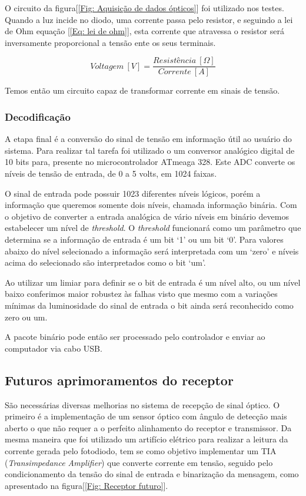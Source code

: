 O circuito da figura[\ref{Fig: Aquisição de dados ópticos}] foi utilizado nos testes. Quando a luz incide no diodo, uma corrente passa pelo resistor, e seguindo a lei de Ohm equação [\ref{Eq: lei de ohm}], esta corrente que atravessa o resistor será inversamente proporcional a tensão ente os seus terminais.

\begin{equation}
Voltagem\:[V] = \frac{Resistência\: [\Omega]}{Corrente\: [A]}
\label{Eq: lei de ohm}
\end{equation}

Temos então um circuito capaz de transformar corrente em sinais de tensão.

\subsubsection{Decodificação}

A etapa final é a conversão do sinal de tensão em informação útil ao usuário do sistema. Para realizar tal tarefa foi utilizado o um conversor analógico digital de 10 bits para, presente no microcontrolador ATmeaga 328. Este ADC converte os níveis de tensão de entrada, de 0 a 5 volts, em 1024 faixas.

O sinal de entrada pode possuir 1023 diferentes níveis lógicos, porém a informação que queremos somente dois níveis, chamada informação binária. 
Com o objetivo de converter a entrada analógica de vário níveis em binário devemos estabelecer um nível de \textit{threshold}. O \textit{threshold} funcionará como um parâmetro que determina se a informação de entrada é um bit \lq 1\rq \: ou um bit \lq 0\rq \:. Para valores abaixo do nível selecionado a informação será interpretada com um \lq zero\rq \: e níveis acima do selecionado são interpretados como o bit \lq um\rq \:.

Ao utilizar um limiar para definir se o bit de entrada é um nível alto, ou um nível baixo conferimos maior robustez às falhas visto que mesmo com a variações mínimas da luminosidade do sinal de entrada o bit ainda será reconhecido como zero ou um.

A pacote binário pode então ser processado pelo controlador e enviar ao computador via cabo USB.

\subsection{Futuros aprimoramentos do receptor}

São necessárias diversas melhorias no sistema de recepção de sinal óptico. O primeiro é a implementação de um sensor óptico com ângulo de detecção mais aberto o que não requer a o perfeito alinhamento do receptor e transmissor.
Da mesma maneira que foi utilizado um artifício elétrico para realizar a leitura da corrente gerada pelo fotodiodo, tem se como objetivo implementar um TIA (\textit{Transimpedance Amplifier}) que converte corrente em tensão, seguido pelo condicionamento da tensão do sinal de entrada e binarização da mensagem, como apresentado na figura[\ref{Fig: Receptor futuro}].


